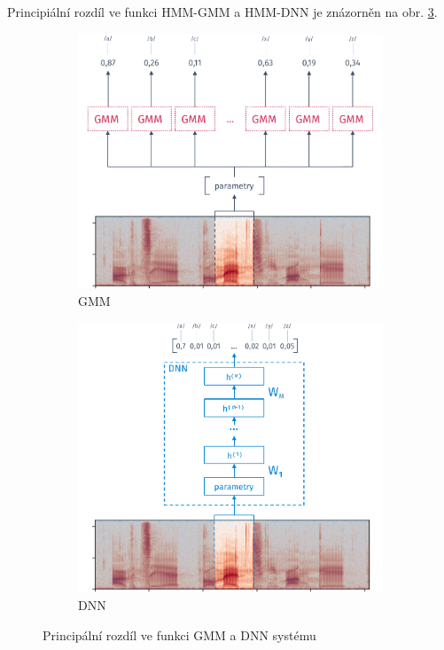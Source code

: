 \noindent Principiální rozdíl ve funkci HMM-GMM a HMM-DNN je znázorněn na obr. \ref{fig:asr:acoustic:dnn:asr:diff}.

\begin{figure}[htpb]
  \centering
  \begin{subfigure}[b]{0.4\textwidth}
    \includegraphics[width=\textwidth]{./ch4-asr/img/hmm-gmm.pdf}
    \caption{GMM}
    \label{fig:asr:acoustic:dnn:asr:diff:dnn}
  \end{subfigure}
  \begin{subfigure}[b]{0.4\textwidth}
    \includegraphics[width=\textwidth]{./ch4-asr/img/hmm-dnn.pdf}
    \caption{DNN}
    \label{fig:asr:acoustic:dnn:asr:diff:dnn}
  \end{subfigure}
  \caption{Principální rozdíl ve funkci GMM a DNN systému}
  \label{fig:asr:acoustic:dnn:asr:diff}
\end{figure}

